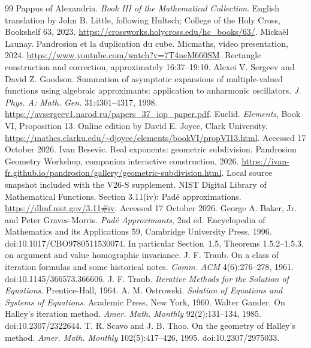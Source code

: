 \begin{thebibliography}{99}\small\setlength{\itemsep}{1.5pt plus 0.5pt}
 Pappus of Alexandria. \emph{Book III of the Mathematical Collection}. English
translation by John B. Little, following Hultsch; College of the Holy Cross, Bookshelf 63, 2023.
\url{https://crossworks.holycross.edu/hc_books/63/}.
 Micka\"el Launay. Pandrosion et la duplication du cube. Micmaths, video presentation,
2024. \url{https://www.youtube.com/watch?v=7T4neM660SM}. Rectangle construction and correction,
approximately 16:37--19:10.
 Alexei V. Sergeev and David Z. Goodson. Summation of asymptotic expansions of
multiple-valued functions using algebraic approximants: application to anharmonic oscillators.
\emph{J. Phys. A: Math. Gen.} 31:4301--4317, 1998.
\url{https://avsergeev1.narod.ru/papers_37_iop_paper.pdf}.
 Euclid. \emph{Elements}, Book VI, Proposition 13. Online edition by David E. Joyce,
Clark University. \url{https://mathcs.clarku.edu/~djoyce/elements/bookVI/propVI13.html}. Accessed
17 October 2026.
 Ivan Besevic. Real exponents: geometric subdivision. Pandrosion Geometry Workshop,
companion interactive construction, 2026.
\url{https://ivan-fr.github.io/pandrosion/gallery/geometric-subdivision.html}. Local source snapshot
included with the V26-S supplement.
 NIST Digital Library of Mathematical Functions. Section 3.11(iv): Pad\'e
approximations. \url{https://dlmf.nist.gov/3.11#iv}. Accessed 17 October 2026.
 George A. Baker, Jr. and Peter Graves-Morris. \emph{Pad\'e Approximants}, 2nd ed.
Encyclopedia of Mathematics and its Applications 59, Cambridge University Press, 1996.
doi:10.1017/CBO9780511530074. In particular Section~1.5, Theorems 1.5.2--1.5.3, on argument and
value homographic invariance.
 J. F. Traub. On a class of iteration formulas and some historical notes.
\emph{Comm. ACM} 4(6):276--278, 1961. doi:10.1145/366573.366606.
 J. F. Traub. \emph{Iterative Methods for the Solution of Equations}. Prentice-Hall,
1964.
 A. M. Ostrowski. \emph{Solution of Equations and Systems of Equations}. Academic
Press, New York, 1960.
 Walter Gander. On Halley's iteration method. \emph{Amer. Math. Monthly}
92(2):131--134, 1985. doi:10.2307/2322644.
 T. R. Scavo and J. B. Thoo. On the geometry of Halley's method. \emph{Amer. Math.
Monthly} 102(5):417--426, 1995. doi:10.2307/2975033.

\end{thebibliography}
